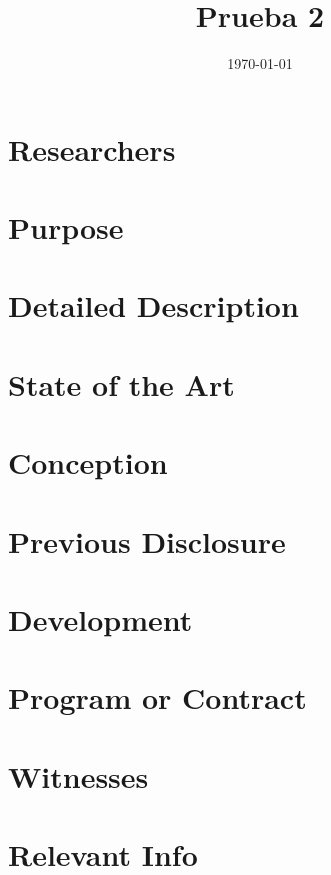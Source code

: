 \documentclass{article}
\title{
Prueba 2
}
\date{\today}
\begin{document}
\maketitle

\section*{Researchers}

\section*{Purpose}

\section*{Detailed Description}

\section*{State of the Art}

\section*{Conception}

\section*{Previous Disclosure}

\section*{Development}

\section*{Program or Contract}

\section*{Witnesses}

\section*{Relevant Info}
\end{document}

